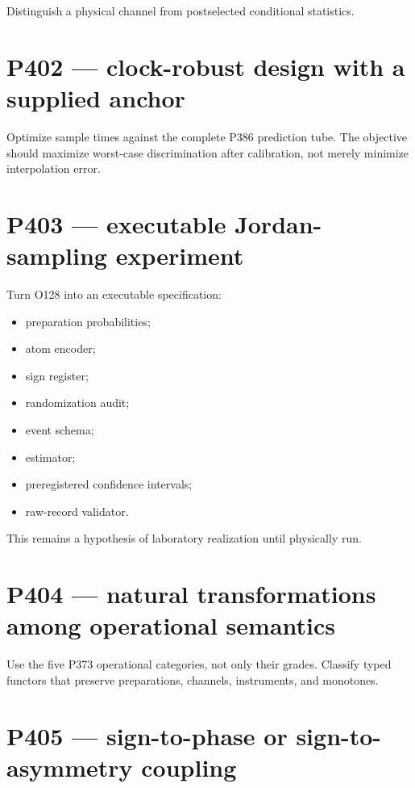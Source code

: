 \documentclass[11pt,a4paper,openany]{report}
\begin{document}
Distinguish a physical channel from postselected conditional statistics.

\section{P402 --- clock-robust design with a supplied anchor}

Optimize sample times against the complete P386 prediction tube. The objective should maximize worst-case discrimination after calibration, not merely minimize interpolation error.

\section{P403 --- executable Jordan-sampling experiment}

Turn O128 into an executable specification:

\begin{itemize}
\item 
preparation probabilities;

\item 
atom encoder;

\item 
sign register;

\item 
randomization audit;

\item 
event schema;

\item 
estimator;

\item 
preregistered confidence intervals;

\item 
raw-record validator.

\end{itemize}

This remains a hypothesis of laboratory realization until physically run.

\section{P404 --- natural transformations among operational semantics}

Use the five P373 operational categories, not only their grades. Classify typed functors that preserve preparations, channels, instruments, and monotones.

\section{P405 --- sign-to-phase or sign-to-asymmetry coupling}
\end{document}
